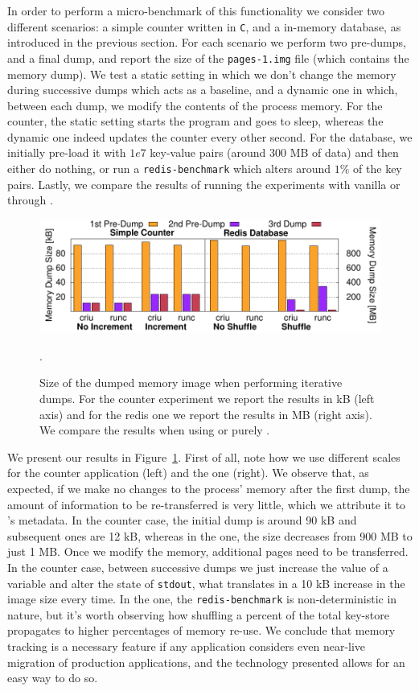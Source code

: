 In order to perform a micro-benchmark of this functionality we consider two different scenarios: a simple counter written in \texttt{C}, and a \redis in-memory database, as introduced in the previous section.
For each scenario we perform two pre-dumps, and a final dump, and report the size of the \texttt{pages-1.img} file (which contains the memory dump).
We test a static setting in which we don't change the memory during successive dumps which acts as a baseline, and a dynamic one in which, between each dump, we modify the contents of the process memory.
For the counter, the static setting starts the program and goes to sleep, whereas the dynamic one indeed updates the counter every other second.
For the database, we initially pre-load it with $1e7$ key-value pairs (around 300 MB of data) and then either do nothing, or run a \texttt{redis-benchmark} which alters around $1\%$ of the key pairs.
Lastly, we compare the results of running the experiments with vanilla \criu or through \runc.

\begin{figure}[h!]
    \centering
    \includegraphics[width=.8\textwidth]{figs/iterative-migration-microbenchmark/iterative_migration_microbenchmark.pdf}
    \caption[Size of the memory image for iterative dumps.]{Size of the dumped memory image when performing iterative dumps. For the counter experiment we report the results in kB (left axis) and for the redis one we report the results in MB (right axis). We compare the results when using \runc or purely \criu.\label{fig:iterative-migration-microbenchmark}}.
\end{figure}

We present our results in Figure~\ref{fig:iterative-migration-microbenchmark}.
First of all, note how we use different scales for the counter application (left) and the \redis one (right).
We observe that, as expected, if we make no changes to the process' memory after the first dump, the amount of information to be re-transferred is very little, which we attribute it to \criu's metadata.
In the counter case, the initial dump is around 90 kB and subsequent ones are 12 kB, whereas in the \redis one, the size decreases from 900 MB to just 1 MB.
Once we modify the memory, additional pages need to be transferred.
In the counter case, between successive dumps we just increase the value of a variable and alter the state of \texttt{stdout}, what translates in a 10 kB increase in the image size every time.
In the \redis one, the \texttt{redis-benchmark} is non-deterministic in nature, but it's worth observing how shuffling a percent of the total key-store propagates to higher percentages of memory re-use.
We conclude that memory tracking is a necessary feature if any application considers even near-live migration of production applications, and the technology presented allows for an easy way to do so.

